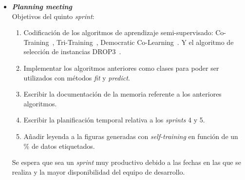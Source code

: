 \begin{itemize}
\item \textbf{\textit{Planning meeting}}\\
Objetivos del quinto \textit{sprint}:
\begin{enumerate}
\item Codificación de los algoritmos de aprendizaje semi-supervisado: Co-Training~\cite{blum1998combining}, Tri-Training~\cite{zhou2005tri}, Democratic Co-Learning~\cite{zhou2004democratic}. Y el algoritmo de selección de instancias DROP3~\cite{wilson2000reduction}.
\item Implementar los algoritmos anteriores como clases para poder ser utilizados con métodos \textit{fit} y \textit{predict}.
\item Escribir la documentación de la memoria referente a los anteriores algoritmos.
\item Escribir la planificación temporal relativa a los \textit{sprints} 4 y 5.
\item Añadir leyenda a la figuras generadas con \textit{self-training} en función de un \% de datos etiquetados.
\end{enumerate}
Se espera que sea un \textit{sprint} muy productivo debido a las fechas en las que se realiza y la mayor disponibilidad del equipo de desarrollo.


\end{itemize}
